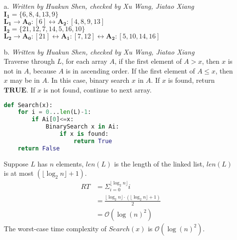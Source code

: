 \documentclass[10pt]{article}
\begin{document}
\begin{itemize}
\item[a.]\textit{Written by Huakun Shen, checked by Xu Wang, Jiatao Xiang}\\
$\boldsymbol{I_1}=\{6,8,4,13,9\}$\\
$\boldsymbol{L_1}\rightarrow \boldsymbol{A_0}:[6]\leftrightarrow \boldsymbol{A_2}:[4,8,9,13]$\\
$\boldsymbol{I_2}=\{21,12,7,14,5,16,10\}$\\
$\boldsymbol{L_2}\rightarrow \boldsymbol{A_0}:[21]\leftrightarrow \boldsymbol{A_1}:[7,12]\leftrightarrow \boldsymbol{A_2}:[5,10,14,16]$
\item[b.]\textit{Written by Huakun Shen, checked by Xu Wang, Jiatao Xiang}\\
Traverse through $L$, for each array $A$, if the first element of $A>x$, then $x$ is not in $A$, because $A$ is in ascending order. If the first element of $A\leq x$, then $x$ may be in $A$. In this case, binary search $x$ in $A$. If $x$ is found, return $\boldsymbol{TRUE}$. If $x$ is not found, continue to next array.
\begin{lstlisting}[language=Python]
def Search(x):
	for i = 0...len(L)-1:
		if Ai[0]<=x:
			BinarySearch x in Ai:
				if x is found:
					return True
	return False
\end{lstlisting}
Suppose $L$ has $n$ elements, $len(L)$ is the length of the linked list, $len(L)$ is at most $(\lfloor\log_2n\rfloor + 1)$.
\begin{align*}
RT &= \Sigma^{\lfloor\log_2n\rfloor}_{i=0}i\\
&=\frac{\lfloor\log_2n\rfloor\cdot(\lfloor\log_2n\rfloor+1)}{2}\\
&=\mathcal{O}(\log(n)^2)
\end{align*}
The worst-case time complexity of $Search(x)$ is $\mathcal{O}(\log(n)^2)$.



\end{itemize}
\end{document}
